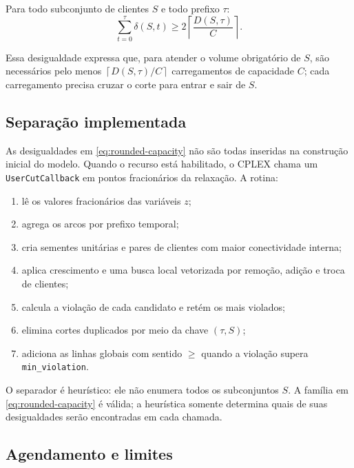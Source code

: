 \documentclass[11pt,a4paper]{article}
\newcommand{\ceil}[1]{\left\lceil #1 \right\rceil}
\begin{document}
Para todo subconjunto de clientes $S$ e todo prefixo $\tau$:
\begin{equation}
  \sum_{t=0}^{\tau}\delta(S,t)
  \ge
  2\ceil{\frac{D(S,\tau)}{C}}.
  \label{eq:rounded-capacity}
\end{equation}

Essa desigualdade expressa que, para atender o volume obrigatório de $S$, são
necessários pelo menos $\ceil{D(S,\tau)/C}$ carregamentos de capacidade $C$;
cada carregamento precisa cruzar o corte para entrar e sair de $S$.

\subsection{Separação implementada}

As desigualdades em \eqref{eq:rounded-capacity} não são todas inseridas na
construção inicial do modelo. Quando o recurso está habilitado, o CPLEX chama
um \texttt{UserCutCallback} em pontos fracionários da relaxação. A rotina:

\begin{enumerate}[leftmargin=1.8em]
  \item lê os valores fracionários das variáveis $z$;
  \item agrega os arcos por prefixo temporal;
  \item cria sementes unitárias e pares de clientes com maior conectividade
        interna;
  \item aplica crescimento e uma busca local vetorizada por remoção, adição e
        troca de clientes;
  \item calcula a violação de cada candidato e retém os mais violados;
  \item elimina cortes duplicados por meio da chave $(\tau,S)$;
  \item adiciona as linhas globais com sentido $\ge$ quando a violação supera
        \texttt{min\_violation}.
\end{enumerate}

O separador é heurístico: ele não enumera todos os subconjuntos $S$. A família
em \eqref{eq:rounded-capacity} é válida; a heurística somente determina quais
de suas desigualdades serão encontradas em cada chamada.

\subsection{Agendamento e limites}
\end{document}

